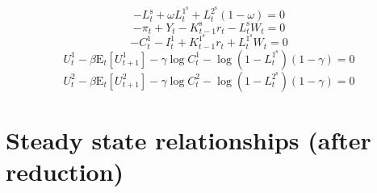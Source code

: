 \begin{equation}
-L^{\mathrm{s}}_{t} + {\omega} {L^{\mathrm{1}^{\mathrm{s}}}_{t}} + {L^{\mathrm{2}^{\mathrm{s}}}_{t}} \left(1 - \omega\right) = 0
\end{equation}
\begin{equation}
-\pi_{t} + Y_{t} - {K^{\mathrm{s}}_{t-1}} {r_{t}} - {L^{\mathrm{s}}_{t}} {W_{t}} = 0
\end{equation}
\begin{equation}
-C^{\mathrm{1}}_{t} - I^{\mathrm{1}}_{t} + {K^{\mathrm{1}^{\mathrm{s}}}_{t-1}} {r_{t}} + {L^{\mathrm{1}^{\mathrm{s}}}_{t}} {W_{t}} = 0
\end{equation}
\begin{equation}
U^{\mathrm{1}}_{t} - {\beta} {\mathrm{E}_{t}\left[U^{\mathrm{1}}_{t+1}\right]} - {\gamma} {\log{C^{\mathrm{1}}_{t}}} - {\log\left(1 - L^{\mathrm{1}^{\mathrm{s}}}_{t}\right)} \left(1 - \gamma\right) = 0
\end{equation}
\begin{equation}
U^{\mathrm{2}}_{t} - {\beta} {\mathrm{E}_{t}\left[U^{\mathrm{2}}_{t+1}\right]} - {\gamma} {\log{C^{\mathrm{2}}_{t}}} - {\log\left(1 - L^{\mathrm{2}^{\mathrm{s}}}_{t}\right)} \left(1 - \gamma\right) = 0
\end{equation}



\section{Steady state relationships (after reduction)}

